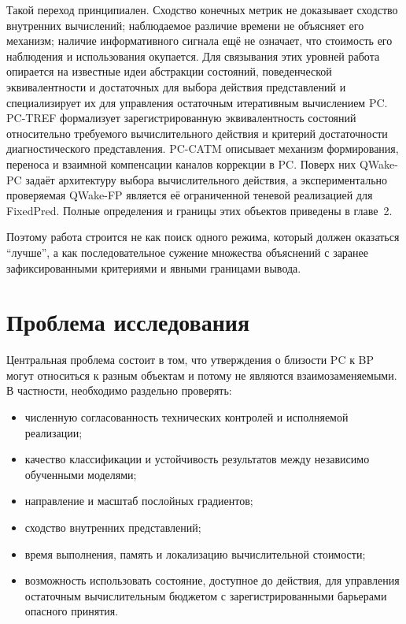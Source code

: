 Такой переход принципиален. Сходство конечных метрик не доказывает сходство
внутренних вычислений; наблюдаемое различие времени не объясняет его механизм;
наличие информативного сигнала ещё не означает, что стоимость его наблюдения и
использования окупается. Для связывания этих уровней работа опирается на известные идеи абстракции
состояний, поведенческой эквивалентности и достаточных для выбора действия
представлений \cite{ferns2004metrics,li2006stateabstraction,huang2022actionsufficient,raman2026decisionrelevant}
и специализирует их для управления остаточным итеративным вычислением PC.
PC-TREF формализует зарегистрированную эквивалентность состояний относительно
требуемого вычислительного действия и критерий достаточности диагностического
представления. PC-CATM описывает механизм формирования, переноса и взаимной
компенсации каналов коррекции в PC.
Поверх них QWake-PC задаёт архитектуру выбора вычислительного действия, а
экспериментально проверяемая QWake-FP является её ограниченной теневой
реализацией для FixedPred. Полные определения и границы этих объектов приведены
в главе~2.

Поэтому работа строится не как поиск одного режима, который должен оказаться
``лучше'', а как последовательное сужение множества объяснений с заранее
зафиксированными критериями и явными границами вывода.

\section{Проблема исследования}

Центральная проблема состоит в том, что утверждения о близости PC к BP могут
относиться к разным объектам и потому не являются взаимозаменяемыми. В
частности, необходимо раздельно проверять:

\begin{itemize}
  \item численную согласованность технических контролей и исполняемой
  реализации;
  \item качество классификации и устойчивость результатов между независимо
  обученными моделями;
  \item направление и масштаб послойных градиентов;
  \item сходство внутренних представлений;
  \item время выполнения, память и локализацию вычислительной стоимости;
  \item возможность использовать состояние, доступное до действия, для
  управления остаточным вычислительным бюджетом с зарегистрированными барьерами
  опасного принятия.
\end{itemize}


